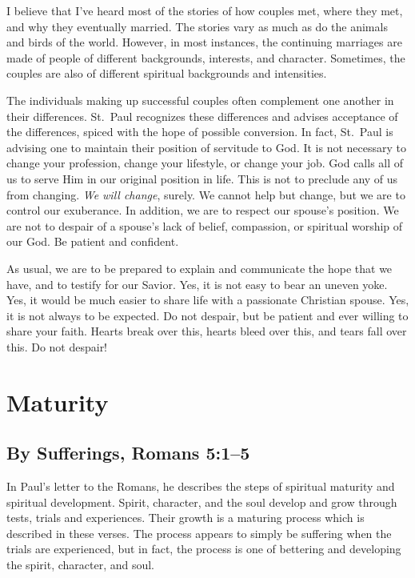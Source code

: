 \documentclass[12pt]{memoir}
\begin{document}
I believe that I've heard most of the stories of how couples met,
where they met, and why they eventually married. The stories vary
as much as do the animals and birds of the world. However, in most instances,
the continuing marriages are made of people of different backgrounds,
interests, and character. Sometimes, the couples are also of different
spiritual backgrounds and intensities. 

The individuals making up successful couples often complement one another in their differences. 
St.~Paul recognizes these differences and advises acceptance of the
differences, spiced with the hope of possible conversion. In fact,
St.~Paul is advising one to maintain their position of servitude to
God. It is not necessary to change your profession, change your lifestyle,
or change your job. God calls all of us to serve Him in our original
position in life. This is not to preclude any of us from changing.
\emph{We will change}, surely. We cannot help but change, but we are
to control our exuberance. In addition, we are to respect our spouse's
position. We are not to despair of a spouse's lack of belief, compassion,
or spiritual worship of our God. Be patient and confident. 

As usual, we are to be prepared to explain and communicate the hope
that we have, and to testify for our Savior. Yes, it is not easy to
bear an uneven yoke. Yes, it would be much easier to share life with
a passionate Christian spouse. Yes, it is not always to be expected.
Do not despair, but be patient and ever willing to share your faith.
Hearts break over this, hearts bleed over this, and tears fall over
this. Do not despair!

\section{Maturity}

\subsection[By Sufferings]{By Sufferings, Romans 5:1--5}\label{maturity_by_suffering}
In Paul's letter to the Romans, he describes the steps of spiritual
maturity and spiritual development. Spirit, character, and the soul develop and grow through tests, trials and experiences. Their growth
is a maturing process which is described in these verses. The process
appears to simply be suffering when the trials are experienced, but
in fact, the process is one of bettering and developing the
spirit, character, and soul. 
\end{document}
